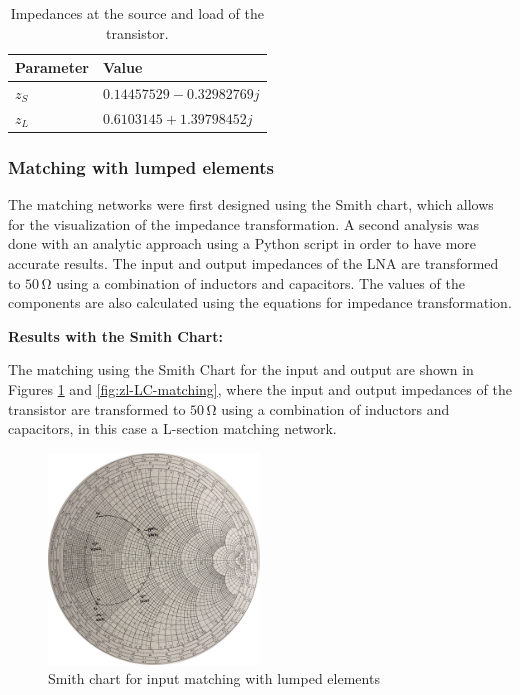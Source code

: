 \begin{table}[H]
    \centering
    \caption{Impedances at the source and load of the transistor.}
    \begin{tabularx}{\textwidth}{>{\centering\arraybackslash}X >{\centering\arraybackslash}X}
        \toprule
        \textbf{Parameter} & \textbf{Value} \\
        \midrule
        $z_{S}$     & $0.14457529-0.32982769j$ \\
        \midrule
        $z_{L}$     & $0.6103145+1.39798452j$\\
        \bottomrule
    \end{tabularx}
    \label{tab:Impedances}
\end{table}




\subsubsection{Matching with lumped elements}

The matching networks were first designed using the Smith chart, which allows for the visualization of the impedance transformation. A second analysis was done with an analytic approach using a Python script in order to have more accurate results. The input and output impedances of the LNA are transformed to $50\,\si{\ohm}$ using a combination of inductors and capacitors. The values of the components are also calculated using the equations for impedance transformation. 

\vspace{0.4cm}
\textbf{Results with the Smith Chart:}
\vspace{0.4cm}

The matching using the Smith Chart for the input and output are shown in Figures \ref{fig:zs-LC-matching} and \ref{fig:zl-LC-matching}, where the input and output impedances of the transistor are transformed to $50\,\si{\ohm}$ using a combination of inductors and capacitors, in this case a L-section matching network.

\begin{figure}[H]
    \centering
    \includegraphics[width=0.5\textwidth]{Images/zs-LC-matching.png}
    \caption{Smith chart for input matching with lumped elements}
    \label{fig:zs-LC-matching}
\end{figure}

